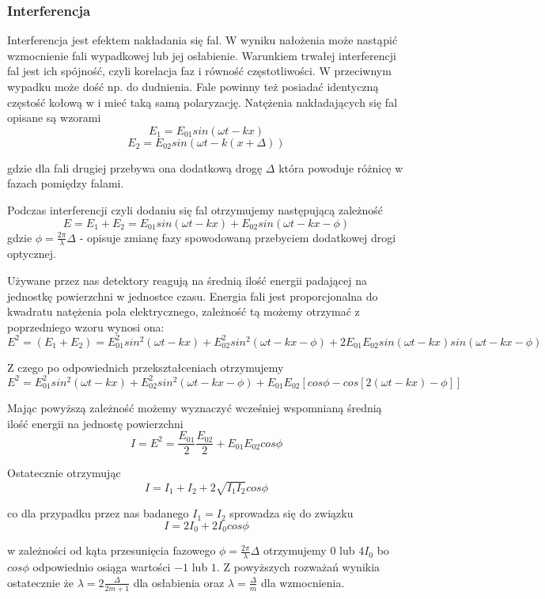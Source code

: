 \documentclass[a4paper]{article}
\newlength{\du}
\begin{document}
\subsubsection{Interferencja}

Interferencja jest efektem nakładania się fal. W wyniku nałożenia może nastąpić wzmocnienie fali wypadkowej lub jej osłabienie.  Warunkiem trwałej interferencji fal jest ich spójność, czyli korelacja faz i równość częstotliwości. W przeciwnym wypadku może dość np. do dudnienia. %
Fale powinny też posiadać identyczną częstość kołową w i mieć taką samą polaryzację.
Natężenia nakładających się fal opisane są wzorami
$$E_{1} = E_{01} sin( \omega t − kx )$$
$$E_{2} = E_{02} sin( \omega t − k ( x + \Delta ))$$

gdzie dla fali drugiej przebywa ona dodatkową drogę $\Delta$ która powoduje różnicę w fazach pomiędzy falami.

Podczas interferencji czyli dodaniu się fal otrzymujemy następującą zależność
$$E = E_{1} + E_{2} = E_{01} sin( \omega t − kx ) + E_{02} sin( \omega t − k x  − \phi )$$ gdzie $\phi =\frac{2\pi}{\lambda}\Delta$ - opisuje zmianę fazy spowodowaną przebyciem dodatkowej drogi optycznej.

Używane przez nas detektory reagują na średnią ilość energii padającej na jednostkę powierzchni w jednostce czasu. Energia fali jest proporcjonalna do kwadratu natężenia pola elektrycznego, zależność tą możemy otrzymać z poprzedniego wzoru wynosi ona:
$$E^2 = ( E_{1} + E_{2} ) = E_{01}^2 sin^2 ( \omega t − kx ) + E_{02}^2 sin^2 ( \omega t − kx − \phi ) + 2 E_{01} E_{02} sin( \omega t − kx ) sin( \omega t − kx − \phi )$$

Z czego po odpowiednich przekształceniach otrzymujemy 
$$E^2 = E_{01}^2 sin^2 (\omega t − kx ) + E_{02}^2 sin^2 ( \omega t − kx − \phi ) + E_{01} E_{02} [cos \phi − cos[ 2 ( \omega t − kx ) − \phi ]]$$

Mając powyższą zależność możemy wyznaczyć wcześniej wspomnianą średnią ilość energii na jednostę powierzchni
$$I = E^2 =\frac{E_{01}}{2} \frac{E_{02}}{2} + E_{01}E_{02} cos \phi$$

Ostatecznie otrzymując 
$$I = I_{1} + I_{2} + 2 \sqrt{I_{1} I_{2}} cos \phi$$

co dla przypadku przez nas badanego $I_{1} = I_{2}$ sprowadza się do związku
$$I = 2I_{0} + 2 I_{0} cos \phi$$

w zależności od kąta przesunięcia fazowego $\phi =\frac{2\pi}{\lambda}\Delta$ otrzymujemy $0$ lub $4 I_{0}$ bo $cos \phi$ odpowiednio osiąga wartości $-1$ lub $1$. Z powyższych rozważań wynikia ostatecznie że 
$\lambda = 2 \frac{\Delta}{2m+1} $ dla osłabienia oraz $\lambda = \frac{\Delta}{m}$ dla wzmocnienia.
\end{document}
